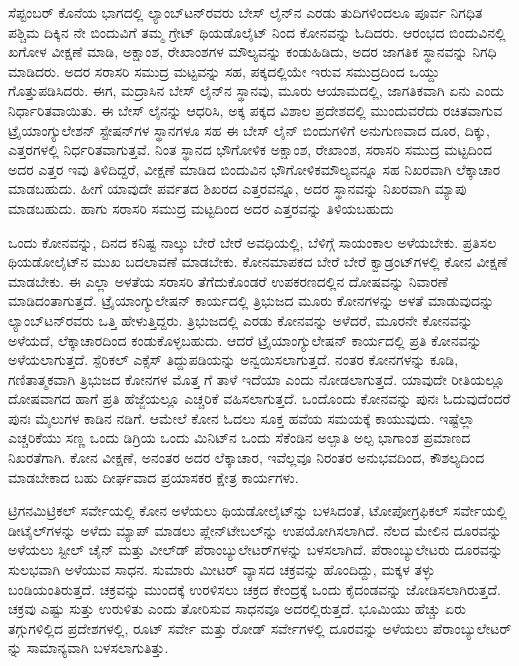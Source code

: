 ಸೆಪ್ಟಂಬರ್​ ಕೊನೆಯ ಭಾಗದಲ್ಲಿ ಲ್ಯಾಂಬ್​ಟನ್​ರವರು ಬೇಸ್​ ಲೈನ್​ನ ಎರಡು ತುದಿಗಳಿಂದಲೂ ಪೂರ್ವ ನಿಗಧಿತ ಪಶ್ಚಿಮ ದಿಕ್ಕಿನ ನೇ ಬಿಂದುವಿಗೆ ತಮ್ಮ ಗ್ರೇಟ್​ ಥಿಯಡೊಲೈಟ್​
ನಿಂದ ಕೋನವನ್ನು ಓದಿದರು. ಆರಂಭದ ಬಿಂದುವಿನಲ್ಲಿ ಖಗೋಳ ವೀಕ್ಷಣೆ ಮಾಡಿ, ಅಕ್ಷಾಂಶ, ರೇಖಾಂಶಗಳ ಮೌಲ್ಯವನ್ನು ಕಂಡುಹಿಡಿದು, ಅದರ ಜಾಗತಿಕ ಸ್ಥಾನವನ್ನು ನಿಗಧಿ ಮಾಡಿದರು. ಅದರ ಸರಾಸರಿ ಸಮುದ್ರ ಮಟ್ಟವನ್ನು ಸಹ, ಪಕ್ಕದಲ್ಲಿಯೇ ಇರುವ ಸಮುದ್ರದಿಂದ ಒಯ್ದು ಗೊತ್ತುಪಡಿಸಿದರು. ಈಗ, ಮದ್ರಾಸಿನ ಬೇಸ್​ ಲೈನ್​ನ ಸ್ಥಾನವು, ಮೂರು ಆಯಾಮದಲ್ಲಿ, ಜಾಗತಿಕವಾಗಿ ಏನು ಎಂದು ನಿರ್ಧಾರಿತವಾಯಿತು. ಈ ಬೇಸ್​ ಲೈನನ್ನು ಆಧರಿಸಿ, ಅಕ್ಕ ಪಕ್ಕದ ವಿಶಾಲ ಪ್ರದೇಶದಲ್ಲಿ ಮುಂದುವರೆದು ರಚಿತವಾಗುವ ಟ್ರೈಯಾಂಗ್ಯುಲೇಶನ್​ ಸ್ಟೇಷನ್​ಗಳ ಸ್ಥಾನಗಳೂ ಸಹ ಈ ಬೇಸ್​ ಲೈನ್​ ಬಿಂದುಗಳಿಗೆ ಅನುಗುಣವಾದ ದೂರ, ದಿಕ್ಕು, ಎತ್ತರಗಳಲ್ಲಿ ನಿರ್ಧರಿತವಾಗುತ್ತವೆ. ನಿಂತ ಸ್ಥಾನದ ಭೌಗೋಳಿಕ ಅಕ್ಷಾಂಶ, ರೇಖಾಂಶ, ಸರಾಸರಿ ಸಮುದ್ರ ಮಟ್ಟದಿಂದ ಅದರ ಎತ್ತರ ಇವು ತಿಳಿದಿದ್ದರೆ, ವೀಕ್ಷಣೆ ಮಾಡಿದ ಬಿಂದುವಿನ ಭೌಗೋಳಿಕ\break ಮೌಲ್ಯವನ್ನೂ ಸಹ ನಿಖರವಾಗಿ ಲೆಕ್ಕಾಚಾರ ಮಾಡಬಹುದು. ಹೀಗೆ ಯಾವುದೇ ಪರ್ವತದ ಶಿಖರದ ಎತ್ತರವನ್ನೂ, ಅದರ ಸ್ಥಾನವನ್ನು ನಿಖರವಾಗಿ ಮ್ಯಾಪು ಮಾಡಬಹುದು. ಹಾಗು ಸರಾಸರಿ ಸಮುದ್ರ ಮಟ್ಟದಿಂದ ಅದರ ಎತ್ತರವನ್ನು ತಿಳಿಯಬಹುದು

ಒಂದು ಕೋನವನ್ನು, ದಿನದ ಕನಿಷ್ಟ ನಾಲ್ಕು ಬೇರೆ ಬೇರೆ ಅವಧಿಯಲ್ಲಿ, ಬೆಳಿಗ್ಗೆ ಸಾಯಂಕಾಲ ಅಳೆಯಬೇಕು. ಪ್ರತಿಸಲ ಥಿಯಡೋಲೈಟ್​ನ ಮುಖ ಬದಲಾವಣೆ ಮಾಡಬೇಕು. ಕೋನಮಾಪಕದ ಬೇರೆ ಬೇರೆ ಕ್ವಾಡ್ರಂಟ್​ಗಳಲ್ಲಿ ಕೋನ ವೀಕ್ಷಣೆ ಮಾಡಬೇಕು. ಈ ಎಲ್ಲಾ ಅಳತೆಯ ಸರಾಸರಿ ತೆಗೆದುಕೊಂಡರೆ ಉಪಕರಣದಲ್ಲಿನ ದೋಷವನ್ನು ನಿವಾರಣೆ ಮಾಡಿದಂತಾಗುತ್ತದೆ. ಟ್ರೈಯಾಂಗ್ಯುಲೇಷನ್​ ಕಾರ್ಯದಲ್ಲಿ ತ್ರಿಭುಜದ ಮೂರು ಕೋನಗಳನ್ನು ಅಳತೆ ಮಾಡುವುದನ್ನು ಲ್ಯಾಂಬ್​ಟನ್​ರವರು ಒತ್ತಿ ಹೇಳುತ್ತಿದ್ದರು. ತ್ರಿಭುಜದಲ್ಲಿ ಎರಡು ಕೋನವನ್ನು ಅಳೆದರೆ, ಮೂರನೇ ಕೋನವನ್ನು ಅಳೆಯದೆ, ಲೆಕ್ಕಾಚಾರದಿಂದ ಕಂಡುಕೊಳ್ಳಬಹುದು. ಆದರೆ ಟ್ರೈಯಾಂಗ್ಯುಲೇಷನ್​ ಕಾರ್ಯದಲ್ಲಿ ಪ್ರತಿ ಕೋನವನ್ನು ಅಳೆಯಲಾಗುತ್ತದೆ. ಸ್ಪೆರಿಕಲ್​ ಎಕ್ಸೆಸ್​ ತಿದ್ದುಪಡಿಯನ್ನು ಅನ್ವಯಿಸಲಾಗುತ್ತದೆ. ನಂತರ  ಕೋನಗಳನ್ನು ಕೂಡಿ, ಗಣಿತಾತ್ಮಕವಾಗಿ ತ್ರಿಭುಜದ  ಕೋನಗಳ ಮೊತ್ತ  ಗೆ ತಾಳೆ ಇದೆಯಾ ಎಂದು ನೋಡಲಾಗುತ್ತದೆ. ಯಾವುದೇ ರೀತಿಯಲ್ಲೂ ದೋಷವಾಗದ ಹಾಗೆ ಪ್ರತಿ ಹೆಜ್ಜೆಯಲ್ಲೂ ಎಚ್ಚರಿಕೆ ವಹಿಸಲಾಗುತ್ತದೆ. ಒಂದೊಂದು ಕೋನವನ್ನು ಪುನಃ ಓದುವುದೆಂದರೆ ಪುನಃ  ಮೈಲುಗಳ ಕಾಡಿನ ನಡಿಗೆ. ಆಮೇಲೆ ಕೋನ ಓದಲು ಸೂಕ್ತ ಹವೆಯ ಸಮಯಕ್ಕೆ ಕಾಯುವುದು. ಇಷ್ಟೆಲ್ಲಾ ಎಚ್ಚರಿಕೆಯು ಸಣ್ಣ ಒಂದು ಡಿಗ್ರಿಯ ಒಂದು ಮಿನಿಟ್​ನ ಒಂದು ಸೆಕೆಂಡಿನ ಅಲ್ಪಾತಿ ಅಲ್ಪ ಭಾಗಾಂಶ ಪ್ರಮಾಣದ ನಿಖರತೆಗಾಗಿ. ಕೋನ ವೀಕ್ಷಣೆ, ಅನಂತರ ಅದರ ಲೆಕ್ಕಾಚಾರ, ಇವೆಲ್ಲವೂ ನಿರಂತರ ಅನುಭವದಿಂದ, ಕೌಶಲ್ಯದಿಂದ ಮಾಡಬೇಕಾದ ಬಹು ದೀರ್ಘವಾದ ಪ್ರಯಾಸಕರ ಕ್ಷೇತ್ರ ಕಾರ್ಯಗಳು.

ಟ್ರಿಗನಮಿಟ್ರಿಕಲ್​ ಸರ್ವೇಯಲ್ಲಿ ಕೋನ ಅಳೆಯಲು ಥಿಯಡೋಲೈಟ್​ನ್ನು ಬಳಸಿದಂತೆ, ಟೋಪೋಗ್ರಫಿಕಲ್​ ಸರ್ವೇಯಲ್ಲಿ ಡೀಟೈಲ್​ಗಳನ್ನು ಅಳೆದು ಮ್ಯಾಪ್​ ಮಾಡಲು ಪ್ಲೇನ್​\break ಟೇಬಲ್​ನ್ನು ಉಪಯೋಗಿಸಲಾಗಿದೆ. ನೆಲದ ಮೇಲಿನ ದೂರವನ್ನು ಅಳೆಯಲು ಸ್ಟೀಲ್​ ಚೈನ್​ ಮತ್ತು ವೀಲ್​ಡ್​ ಪೆರಾಂಬ್ಯುಲೇಟರ್​ಗಳನ್ನು ಬಳಸಲಾಗಿದೆ. ಪೆರಾಂಬ್ಯುಲೇಟರು ದೂರವನ್ನು ಸುಲಭವಾಗಿ ಅಳೆಯುವ ಸಾಧನ. ಸುಮಾರು  ಮೀಟರ್​ ವ್ಯಾಸದ ಚಕ್ರವನ್ನು ಹೊಂದಿದ್ದು, ಮಕ್ಕಳ ತಳ್ಳು ಬಂಡಿಯಂತಿರುತ್ತದೆ. ಚಕ್ರವನ್ನು ಮುಂದಕ್ಕೆ ಉರಳಿಸಲು ಚಕ್ರದ ಕೇಂದ್ರಕ್ಕೆ ಒಂದು ಕೈದಂಡವನ್ನು ಜೋಡಿಸಲಾಗಿರುತ್ತದೆ. ಚಕ್ರವು ಎಷ್ಟು ಸುತ್ತು ಉರುಳಿತು ಎಂದು ತೋರಿಸುವ ಸಾಧನವೂ ಅದರಲ್ಲಿರುತ್ತದೆ. ಭೂಮಿಯು ಹೆಚ್ಚು ಏರು ತಗ್ಗುಗಳಿಲ್ಲಿದ ಪ್ರದೇಶಗಳಲ್ಲಿ, ರೂಟ್​ ಸರ್ವೇ ಮತ್ತು ರೋಡ್​ ಸರ್ವೇಗಳಲ್ಲಿ ದೂರವನ್ನು ಅಳೆಯಲು ಪೆರಾಂಬ್ಯುಲೇಟರ್​ನ್ನು ಸಾಮಾನ್ಯವಾಗಿ ಬಳಸಲಾಗುತಿತ್ತು.

